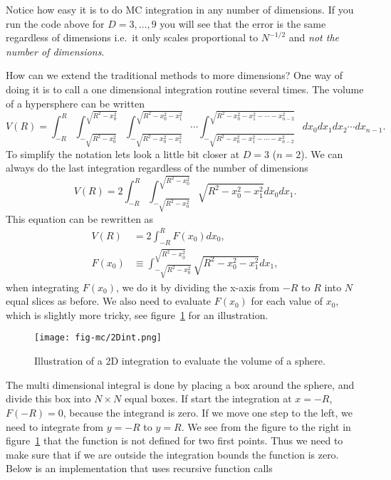 \documentclass[graybox,sectrefs,envcountresetchap,open=right,final]{svmonodo}
\begin{document}
Notice how easy it is to do MC integration in any number of dimensions. If you run the code above for $D=3,\ldots,9$ you will see that the error is the same regardless of dimensions i.e.~it only scales proportional to $N^{-1/2}$ and \emph{not the number of dimensions}.  

How can we extend the traditional methods to more dimensions? One way of doing it is
to call a one dimensional integration routine several times. 
The volume of a hypersphere can be written
\begin{equation}
V(R)=\int_{-R}^{R}\int_{-\sqrt{R^2-x_0^2}}^{\sqrt{R^2-x_0^2}}
\int_{-\sqrt{R^2-x_0^2-x_1^2}}^{\sqrt{R^2-x_0^2-x_1^2}}\cdots
\int_{-\sqrt{R^2-x_0^2-x_1^2-\cdots -x_{n-2}^2}}^{\sqrt{R^2-x_0^2-x_1^2-\cdots -x_{n-2}^2}}dx_0dx_1dx_2\cdots dx_{n-1}.
\label{eq:mc:hypV}
\end{equation}
To simplify the notation lets look a little bit closer at $D=3$ ($n=2$). We can always do the last integration
regardless of the number of dimensions
\begin{equation}
V(R)=2\int_{-R}^{R}\int_{-\sqrt{R^2-x_0^2}}^{\sqrt{R^2-x_0^2}}
\sqrt{R^2-x_0^2-x_1^2}dx_0dx_1.
\label{eq:mc:hypV2}
\end{equation}
This equation can be rewritten as
\begin{align}
V(R)&=2\int_{-R}^{R}F(x_0)dx_0,\nonumber\\ 
F(x_0)&\equiv\int_{-\sqrt{R^2-x_0^2}}^{\sqrt{R^2-x_0^2}}\sqrt{R^2-x_0^2-x_1^2}dx_1,
\label{eq:mc:hypV3}
\end{align}
when integrating $F(x_0)$, we do it by dividing the x-axis from $-R$
to $R$ into $N$ equal slices as before. We also need to evaluate
$F(x_0)$ for each value of $x_0$, which is slightly more tricky, see
figure~\ref{fig:mc:2Dint} for an illustration. 

\begin{figure}[!ht]  %
  \centerline{\texttt{[image: fig-mc/2Dint.png]}}
  \caption{
  Illustration of a 2D integration to evaluate the volume of a sphere.\label{fig:mc:2Dint}
  }
\end{figure}

The multi dimensional
integral is done by placing a box around the sphere, and divide this
box into $N\times N$ equal boxes. If start the integration
at $x=-R$, $F(-R)=0$, because the integrand is zero. If we move one
step to the left, we need to integrate from $y=-R$ to $y=R$. We see
from the figure to the right in figure~\ref{fig:mc:2Dint} that the
function is not defined for two first points. Thus we need to make
sure that if we are outside the integration bounds the function is
zero. Below is an implementation that uses recursive function calls
\end{document}
